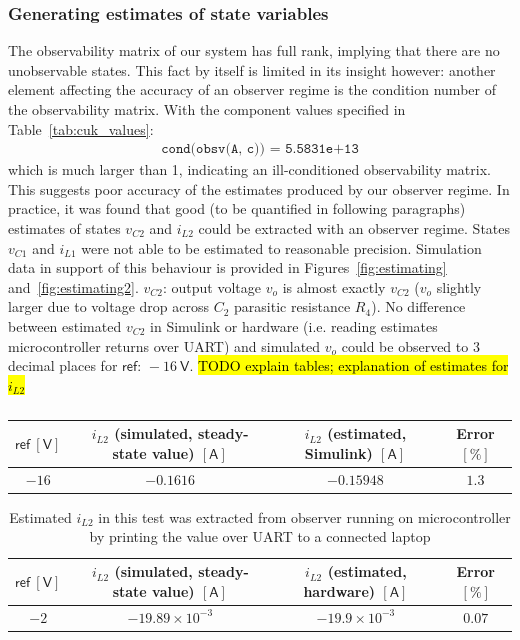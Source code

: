 \subsubsection{Generating estimates of state variables}\label{sec:observing}
The observability matrix of our system has full rank, implying that there are no unobservable states. This fact by itself is limited in its insight however: another element affecting the accuracy of an observer regime is the condition number of the observability matrix.
\newpar
With the component values specified in Table~\ref{tab:cuk_values}:
\begin{align}
\texttt{cond(obsv(A, c)) = 5.5831e+13}
\end{align}
which is much larger than 1, indicating an ill-conditioned observability matrix. This suggests poor accuracy of the estimates produced by our observer regime.
\newpar
In practice, it was found that good (to be quantified in following paragraphs) estimates of states $v_{C2}$ and $i_{L2}$ could be extracted with an observer regime. States $v_{C1}$ and $i_{L1}$ were not able to be estimated to reasonable precision. Simulation data in support of this behaviour is provided in Figures~\ref{fig:estimating} and~\ref{fig:estimating2}.
\newpar
$v_{C2}$: output voltage $v_o$ is almost exactly $v_{C2}$ ($v_o$ slightly larger due to voltage drop across $C_2$ parasitic resistance $R_4$). No difference between estimated $v_{C2}$ in \textsf{Simulink} or hardware (i.e. reading estimates microcontroller returns over UART) and simulated $v_o$ could be observed to 3 decimal places for $\textsf{ref: } \minus 16 \ \mathsf{V}$.
\newpar
\hl{TODO explain tables; explanation of estimates for $i_{L2}$}
\begin{table}[H]
    \centering
    \begin{tabular}{|c|c|c|c|}
    \hline
    $\textsf{ref} \ [\mathsf{V}]$ & $i_{L2}$ (simulated, steady-state value) $[\mathsf{A}]$ & $i_{L2}$ (estimated, \textsf{Simulink}) $[\mathsf{A}]$ & Error $[\mathsf{\%}]$\\
    \hline
    $\minus 16$ & $\minus 0.1616$ & $\minus 0.15948$ & $1.3$\\
    \hline
    \end{tabular}
    \caption{}
    \label{tab:estimating_iL2_ref16}
\end{table}
\begin{table}[H]
    \centering
    \begin{tabular}{|c|c|c|c|}
    \hline
    $\textsf{ref} \ [\mathsf{V}]$ & $i_{L2}$ (simulated, steady-state value) $[\mathsf{A}]$ & $i_{L2}$ (estimated, hardware) $[\mathsf{A}]$ & Error $[\mathsf{\%}]$\\
    \hline
    $\minus 2$ & $\minus 19.89 \times 10^{-3}$ & $\minus 19.9 \times 10^{-3}$ & $0.07$\\
    \hline
    \end{tabular}
    \caption{Estimated $i_{L2}$ in this test was extracted from observer running on microcontroller by printing the value over UART to a connected laptop}
    \label{tab:estimating_iL2_ref2}
\end{table}
